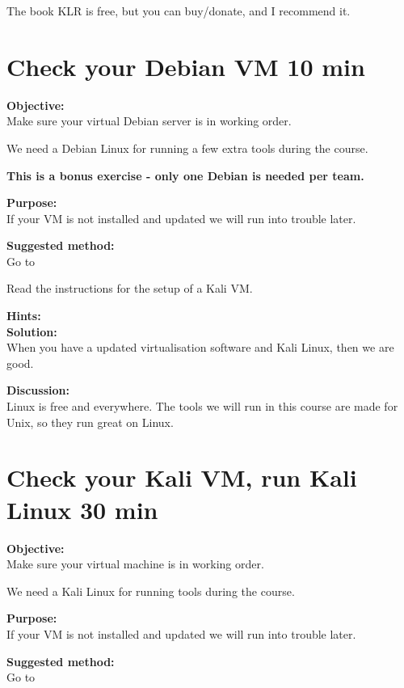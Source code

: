\documentclass[a4paper,11pt,notitlepage]{report}
\begin{document}
The book KLR is free, but you can buy/donate, and I recommend it.



\chapter{Check your Debian VM 10 min}
\label{ex:sw-basicDebianVM}


{\bf Objective:}\\
Make sure your virtual Debian server is in working order.

We need a Debian Linux for running a few extra tools during the course.

{\Large \bf This is a bonus exercise - only one Debian is needed per team.}

{\bf Purpose:}\\
If your VM is not installed and updated we will run into trouble later.

{\bf Suggested method:}\\
Go to 

Read the instructions for the setup of a Kali VM.

{\bf Hints:}\\

{\bf Solution:}\\
When you have a updated virtualisation software and Kali Linux, then we are good.

{\bf Discussion:}\\
Linux is free and everywhere. The tools we will run in this course are made for Unix, so they run great on Linux.


\chapter{Check your Kali VM, run Kali Linux 30 min}
\label{ex:sw-basicVM}


{\bf Objective:}\\
Make sure your virtual machine is in working order.

We need a Kali Linux for running tools during the course.

{\bf Purpose:}\\
If your VM is not installed and updated we will run into trouble later.

{\bf Suggested method:}\\
Go to 
\end{document}
